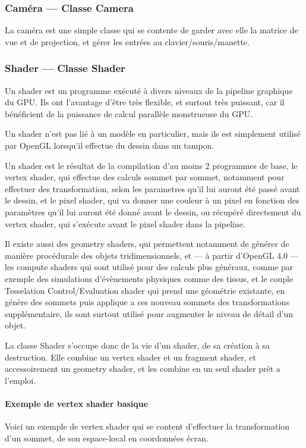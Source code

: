 \documentclass[11pt, a4paper, titlepage]{article}
\begin{document}
\subsubsection{Caméra --- Classe Camera}

La caméra est une simple classe qui se contente de garder avec elle la matrice de vue et de projection, et gérer les entrées au clavier/souris/manette.

\subsubsection{Shader --- Classe Shader}

Un shader est un programme exécuté à divers niveaux de la pipeline graphique du GPU.
Ils ont l'avantage d'être très flexible, et surtout très puissant, car il bénéficient de la puissance de calcul parallèle monstrueuse du GPU.

Un shader n'est pas lié à un modèle en particulier, mais ils est simplement utilisé par OpenGL lorsqu'il effectue du dessin dans un tampon.

Un shader est le résultat de la compilation d'au moins 2 programmes de base, le vertex shader, qui effectue des calculs sommet par sommet,
notamment pour effectuer des transformation, selon les parametres qu'il lui auront été passé avant le dessin, et le pixel shader, qui va
 donner une couleur à un pixel en fonction des paramètres qu'il lui auront été donné avant le dessin, ou récupéré directement du vertex shader, qui
s'exécute avant le pixel shader dans la pipeline.

Il existe aussi des geometry shaders, qui permettent notamment de générer de manière procédurale des objets tridimensionnels, et
 --- à partir d'OpenGL 4.0 --- les compute shaders qui sont utilisé pour des calculs plus généraux, comme par exemple des 
simulations d'évènements physiques comme des tissus, et le couple Tesselation Control/Evaluation shader qui prend une géométrie existante, en génère des sommets
puis applique a ces nouveau sommets des transformations supplémentaire, ils sont surtout utilisé pour augmenter le niveau de détail d'un objet.

La classe Shader s'occupe donc de la vie d'un shader, de sa création à sa destruction.
Elle combine un vertex shader et un fragment shader, et accessoirement un geometry shader, et les combine en un seul shader prêt a l'emploi. 

\pagebreak

\paragraph{Exemple de vertex shader basique\\}
Voici un exemple de vertex shader qui se content d'effectuer la transformation d'un sommet, de son espace-local en coordonnées écran.
\end{document}
